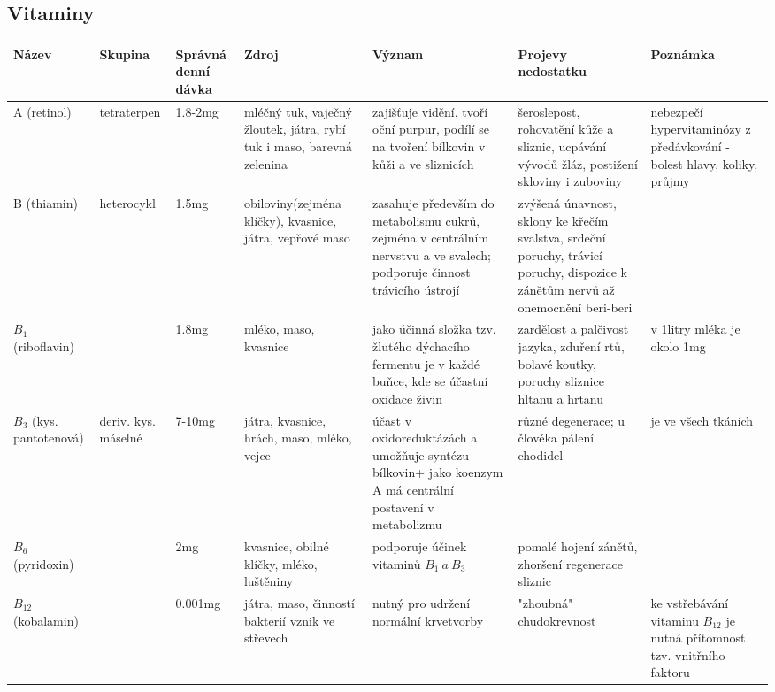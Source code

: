 \begin{landscape}
\subsection{Vitaminy}
    \begin{longtable}{| m{7em} | m{5em} | m{5em} | m{8em}<{\RaggedRight} | m{15em}<{\RaggedRight} | m{15em}<{\RaggedRight} | m{10em}<{\RaggedRight} |}
        \hline
        Název & Skupina & Správná denní dávka & Zdroj & Význam & Projevy nedostatku & Poznámka \\
        \hline
        A (retinol) & tetraterpen & 1.8-2mg & mléčný tuk, vaječný žloutek, játra, rybí tuk i maso, barevná zelenina & zajišťuje vidění, tvoří oční purpur, podílí se na tvoření bílkovin v kůži a ve sliznicích & šeroslepost, rohovatění kůže a sliznic, ucpávání vývodů žláz, postižení skloviny i zuboviny & nebezpečí hypervitaminózy z předávkování - bolest hlavy, koliky, průjmy \\
        \hline
        B (thiamin)& heterocykl & 1.5mg & obiloviny(zejména klíčky), kvasnice, játra, vepřové maso & zasahuje především do metabolismu cukrů, zejména v centrálním nervstvu a ve svalech; podporuje činnost trávicího ústrojí & zvýšená únavnost, sklony ke křečím svalstva, srdeční poruchy, trávicí poruchy, dispozice k zánětům nervů až onemocnění beri-beri & \\
        \hline
        $B_1$ (riboflavin) & & 1.8mg & mléko, maso, kvasnice & jako účinná složka tzv. žlutého dýchacího fermentu je v každé buňce, kde se účastní oxidace živin & zardělost a palčivost jazyka, zduření rtů, bolavé koutky, poruchy sliznice hltanu a hrtanu & v 1litry mléka je okolo 1mg \\
        \hline
        $B_3$ (kys. pantotenová) & deriv. kys. máselné & 7-10mg & játra, kvasnice, hrách, maso, mléko, vejce & účast v oxidoreduktázách a umožňuje syntézu bílkovin+ jako koenzym A má centrální postavení v metabolizmu & různé degenerace; u člověka pálení chodidel & je ve všech tkáních \\
        \hline
        $B_6$ (pyridoxin) & & 2mg & kvasnice, obilné klíčky, mléko, luštěniny & podporuje účinek vitaminů $B_1 ~a~ B_3$ & pomalé hojení zánětů, zhoršení regenerace sliznic & \\
        \hline
        $B_{12}$ (kobalamin)& & 0.001mg & játra, maso, činností bakterií vznik ve střevech & nutný pro udržení normální krvetvorby & "zhoubná" chudokrevnost & ke vstřebávání vitaminu $B_{12}$ je nutná přítomnost tzv. vnitřního faktoru \\

\end{longtable}
\end{landscape}
